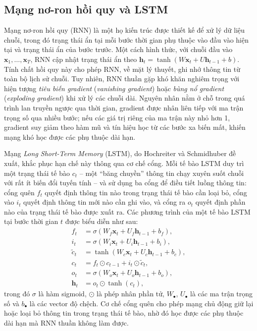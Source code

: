 \subsection{Mạng nơ-ron hồi quy và LSTM}

Mạng nơ-ron hồi quy (RNN) là một họ kiến trúc được thiết kế để xử lý dữ liệu chuỗi, trong đó trạng thái ẩn tại mỗi bước thời gian phụ thuộc vào đầu vào hiện tại và trạng thái ẩn của bước trước. Một cách hình thức, với chuỗi đầu vào $\mathbf{x}_1, \dots, \mathbf{x}_T$, RNN cập nhật trạng thái ẩn theo $\mathbf{h}_t = \tanh(W \mathbf{x}_t + U \mathbf{h}_{t-1} + b)$. Tính chất hồi quy này cho phép RNN, về mặt lý thuyết, ghi nhớ thông tin từ toàn bộ lịch sử chuỗi. Tuy nhiên, RNN thuần gặp khó khăn nghiêm trọng với hiện tượng \emph{tiêu biến gradient} (\textit{vanishing gradient}) hoặc \emph{bùng nổ gradient} (\textit{exploding gradient}) khi xử lý các chuỗi dài. Nguyên nhân nằm ở chỗ trong quá trình lan truyền ngược qua thời gian, gradient được nhân liên tiếp với ma trận trọng số qua nhiều bước; nếu các giá trị riêng của ma trận này nhỏ hơn 1, gradient suy giảm theo hàm mũ và tín hiệu học từ các bước xa biến mất, khiến mạng khó học được các phụ thuộc dài hạn.

Mạng \textit{Long Short-Term Memory} (LSTM), do Hochreiter và Schmidhuber đề xuất, khắc phục hạn chế này thông qua cơ chế cổng. Mỗi tế bào LSTM duy trì một trạng thái tế bào $c_t$ -- một ``băng chuyền'' thông tin chạy xuyên suốt chuỗi với rất ít biến đổi tuyến tính -- và sử dụng ba cổng để điều tiết luồng thông tin: cổng quên $f_t$ quyết định thông tin nào trong trạng thái tế bào cần loại bỏ, cổng vào $i_t$ quyết định thông tin mới nào cần ghi vào, và cổng ra $o_t$ quyết định phần nào của trạng thái tế bào được xuất ra. Các phương trình của một tế bào LSTM tại bước thời gian $t$ được biểu diễn như sau:
\begin{align}
f_t &= \sigma(W_f \mathbf{x}_t + U_f \mathbf{h}_{t-1} + b_f), \\
i_t &= \sigma(W_i \mathbf{x}_t + U_i \mathbf{h}_{t-1} + b_i), \\
\tilde{c}_t &= \tanh(W_c \mathbf{x}_t + U_c \mathbf{h}_{t-1} + b_c), \\
c_t &= f_t \odot c_{t-1} + i_t \odot \tilde{c}_t, \\
o_t &= \sigma(W_o \mathbf{x}_t + U_o \mathbf{h}_{t-1} + b_o), \\
\mathbf{h}_t &= o_t \odot \tanh(c_t),
\end{align}
trong đó $\sigma$ là hàm sigmoid, $\odot$ là phép nhân phần tử, $W_\bullet$, $U_\bullet$ là các ma trận trọng số và $b_\bullet$ là các vector độ chệch. Cơ chế cổng quên cho phép mạng chủ động giữ lại hoặc loại bỏ thông tin trong trạng thái tế bào, nhờ đó học được các phụ thuộc dài hạn mà RNN thuần không làm được.

